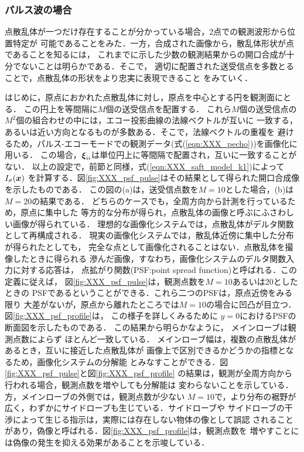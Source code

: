 \subsubsection{パルス波の場合}
点散乱体が一つだけ存在することが分かっている場合，2点での観測波形から位置特定が
可能であることをみた．一方，合成された画像から，散乱体形状が点であることを知るには，
これまでに示した少数の観測結果からの開口合成が十分でないことは明らかである．そこで，
適切に配置された送受信点を多数とることで，点散乱体の形状をより忠実に表現できること
をみていく．

はじめに，原点におかれた点散乱体に対し，原点を中心とする円を観測面にとる．
この円上を等間隔に$M$個の送受信点を配置する．
これら$M$個の送受信点の$M^2$個の組合わせの中には，エコー投影曲線の法線ベクトルが互いに
一致する，あるいは近い方向となるものが多数ある．そこで，法線ベクトルの重複を
避けるため，パルス-エコーモードでの観測データ(式(\ref{eqn:XXX_pecho}))を画像化に用いる．
この場合，$\mbox{\boldmath $\xi$}_{ii}$は単位円上に等間隔で配置され，互いに一致することがない．
以上の設定で，前節と同様，式(\ref{eqn:XXX_saft_model_k1})によって$I_\sigma(\mbox{\boldmath $x$})$
を計算する．図\ref{fig:XXX_psf_pulse}はその結果として得られた開口合成像を示したものである．
この図の(a)は，送受信点数を$M=10$とした場合，(b)は$M=20$の結果である．
どちらのケースでも，全周方向から計測を行っているため，原点に集中した
等方的な分布が得られ，点散乱体の画像と呼ぶにふさわしい画像が得られている．
理想的な画像化システムでは，点散乱体がデルタ関数として再構成される．
現実の画像化システムでは，散乱体近傍に集中した分布が得られたとしても，
完全な点として画像化されることはない．点散乱体を撮像したときに得られる
滲んだ画像，すなわち，画像化システムのデルタ関数入力に対する応答は，
点拡がり関数(PSF:point spread function)と呼ばれる．この定義に従えば，
図\ref{fig:XXX_psf_pulse}は，観測点数を$M=10$あるいは20としたときの
PSFであるということができる．これら二つのPSFは，原点近傍をみる限り
大差がないが，原点から離れたところでは$M=10$の場合に凹凸が目立つ．
図\ref{fig:XXX_psf_profile}は， この様子を詳しくみるために 
$y=0$におけるPSFの断面図を示したものである．
この結果から明らかなように， メインローブは観測点数によらず
ほとんど一致している．
メインローブ幅は，複数の点散乱体があるとき，互いに接近した点散乱体が
画像上で区別できるかどうかの指標となるため，画像化システムの分解能
とみなすことができる．図\ref{fig:XXX_psf_pulse}と図\ref{fig:XXX_psf_profile}
の結果は，観測が全周方向から行われる場合，観測点数を増やしても分解能は
変わらないことを示している． 方，メインローブの外側では，観測点数が少ない
$M=10$で，より分布の裾野が広く，わずかにサイドローブも生じている．サイドローブや
サイドローブの干渉によって生じる指示は，実際には存在しない物体の像として誤認
されることがあり，偽像と呼ばれる．図\ref{fig:XXX_psf_profile}は，観測点数を
増やすことには偽像の発生を抑える効果があることを示唆している．

